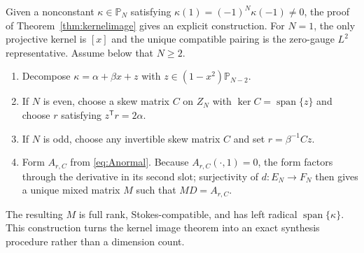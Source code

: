 \documentclass[11pt,a4paper]{article}
\theoremstyle{definition}
\theoremstyle{remark}
\newcommand{\Pp}{\mathbb{P}}
\newcommand{\Ker}{\operatorname{ker}}
\newcommand{\spanof}{\operatorname{span}}
\begin{document}
Given a nonconstant $\kappa\in\Pp_N$ satisfying
$\kappa(1)=(-1)^N\kappa(-1)\neq0$, the proof of
Theorem~\ref{thm:kernelimage} gives an explicit construction.
For $N=1$, the only projective kernel is $[x]$ and the unique compatible pairing is the
zero-gauge $L^2$ representative.  Assume below that $N\geq2$.
\begin{enumerate}
\item Decompose $\kappa=\alpha+\beta x+z$ with
$z\in(1-x^2)\Pp_{N-2}$.
\item If $N$ is even, choose a skew matrix $C$ on $Z_N$ with
$\Ker C=\spanof\{z\}$ and choose $r$ satisfying $z^{\mathsf T}r=2\alpha$.
\item If $N$ is odd, choose any invertible skew matrix $C$ and set
$r=\beta^{-1}Cz$.
\item Form $A_{r,C}$ from \eqref{eq:Anormal}.  Because
$A_{r,C}(\cdot,1)=0$, the form factors through the derivative in its second slot; surjectivity
of $d:E_N\to F_N$ then gives a unique mixed matrix $M$ such that $MD=A_{r,C}$.
\end{enumerate}
The resulting $M$ is full rank, Stokes-compatible, and has left radical
$\spanof\{\kappa\}$.  This construction turns the kernel image theorem into an exact
synthesis procedure rather than a dimension count.
\end{document}

